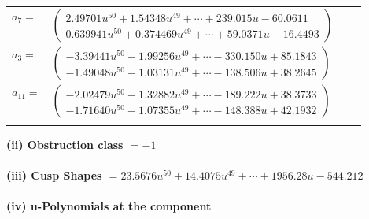 \documentclass[1p]{elsarticle_modified}
\theoremstyle{definition}
\begin{document}
\begin{tabular}{m{7pt} m{180pt} m{7pt} m{180pt} }
\flushright $a_{7}=$&$\begin{pmatrix}2.49701 u^{50}+1.54348 u^{49}+\cdots+239.015 u-60.0611\\0.639941 u^{50}+0.374469 u^{49}+\cdots+59.0371 u-16.4493\end{pmatrix}$ \\
\flushright $a_{3}=$&$\begin{pmatrix}-3.39441 u^{50}-1.99256 u^{49}+\cdots-330.150 u+85.1843\\-1.49048 u^{50}-1.03131 u^{49}+\cdots-138.506 u+38.2645\end{pmatrix}$ \\
\flushright $a_{11}=$&$\begin{pmatrix}-2.02479 u^{50}-1.32882 u^{49}+\cdots-189.222 u+38.3733\\-1.71640 u^{50}-1.07355 u^{49}+\cdots-148.388 u+42.1932\end{pmatrix}$\\&\end{tabular}
\flushleft \textbf{(ii) Obstruction class $= -1$}\\~\\
\flushleft \textbf{(iii) Cusp Shapes $= 23.5676 u^{50}+14.4075 u^{49}+\cdots+1956.28 u-544.212$}\\~\\
\newpage\renewcommand{\arraystretch}{1}
\flushleft \textbf{(iv) u-Polynomials at the component}\newline \\
\end{document}
